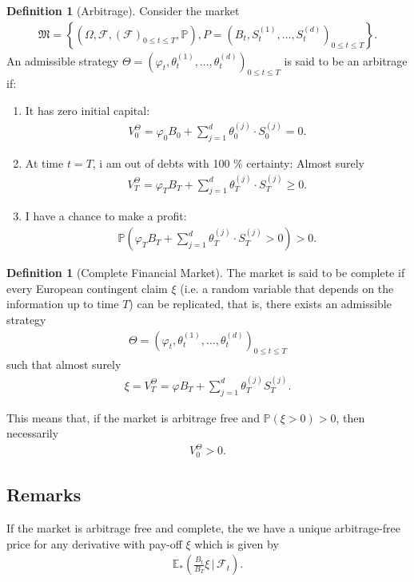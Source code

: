 \documentclass{article}
\theoremstyle{definition}
\newtheorem{definition}[theorem]{Definition}
\numberwithin{equation}{section}
\begin{document}
\begin{definition}[Arbitrage]
    Consider the market
    \begin{align}
        \mathfrak{M} =
        \left\{
            \left(
                \Omega, 
                \mathscr{F}, 
                \left(
                    \mathscr{F}
                \right)_{0 \leq t \leq T},
                \mathbb{P}
            \right),
            P =
            \left(
                B_t,
                S_t^{(1)},
                \ldots,
                S_t^{(d)}
            \right)_{0 \leq t \leq T}
        \right\}.
    \end{align}
    An admissible strategy $\Theta = \left(\varphi_t, \theta_t^{(1)}, \ldots, \theta_t^{(d)}\right)_{0 \leq t \leq T}$ is said to be an arbitrage if:
    \begin{enumerate}
        \item It has zero initial capital:
        \begin{align}
            V_0^\Theta = \varphi_0B_0 + \sum_{j = 1}^d\theta_0^{(j)} \cdot S_0^{(j)} = 0.
        \end{align}
        \item At time $t = T$, i am out of debts with 100 \% certainty: Almost surely
        \begin{align}
            V_T^\Theta = \varphi_T B_T + \sum_{j = 1}^d\theta_T^{(j)} \cdot S_T^{(j)} \geq 0.
        \end{align}
        \item I have a chance to make a profit:
        \begin{align}
            \mathbb{P}
            \left(
                \varphi_TB_T + \sum_{j = 1}^d \theta_T^{(j)} \cdot S_T^{(j)} > 0
            \right) > 0.
        \end{align}
    \end{enumerate}
\end{definition}
\begin{definition}[Complete Financial Market]
    The market is said to be complete if every European contingent claim $\xi$ (i.e. a random variable that depends on the information up to time $T$) can be replicated, that is, there exists an admissible strategy
    \begin{align}
        \Theta = \left(\varphi_t, \theta_t^{(1)}, \ldots, \theta_t^{(d)}\right)_{0 \leq t \leq T}
    \end{align}
    such that almost surely
    \begin{align}
        \xi = V_T^{\Theta} = \varphi B_T + \sum_{j = 1}^d \theta_T^{(j)}S_T^{(j)}.
    \end{align}
\end{definition}
This means that, if the market is arbitrage free and $\mathbb{P}\left(\xi > 0\right) > 0$, then necessarily
\begin{align}
    V_0^\Theta > 0.
\end{align}

\subsection{Remarks}
If the market is arbitrage free and complete, the we have a unique arbitrage-free price for any derivative with pay-off $\xi$ which is given by
\begin{align}
    \mathbb{E}_*\left(\frac{B_t}{B_T}\xi\,\bigg|\,\mathscr{F}_t\right).
\end{align}
\end{document}
